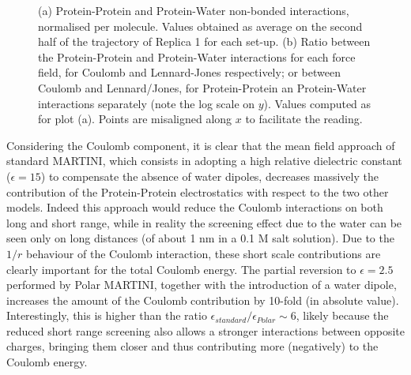 \begin{figure}[p!]
\centering
{} 
\caption[Non-bonded protein energy contribution to capsule structures]{(a) Protein-Protein and Protein-Water non-bonded interactions, normalised per molecule. Values obtained as average on the second half of the trajectory of Replica 1 for each set-up. (b) Ratio between the Protein-Protein and Protein-Water interactions for each force field, for Coulomb and Lennard-Jones respectively; or between Coulomb and Lennard/Jones, for Protein-Protein an Protein-Water interactions separately (note the log scale on $y$). Values computed as for plot (a). Points are misaligned along $x$ to facilitate the reading.}
\label{fig:eng_cg}
\end{figure}

Considering the Coulomb component, it is clear that the mean field approach of standard MARTINI, which consists in adopting a high relative dielectric constant ($\epsilon = 15$) to compensate the absence of water dipoles, decreases massively the contribution of the Protein-Protein electrostatics with respect to the two other models.
%
Indeed this approach would reduce the Coulomb interactions on both long and short range, while in reality the screening effect due to the water can be seen only on long distances (of about 1 nm in a 0.1 M salt solution). Due to the $1/r$ behaviour of the Coulomb interaction, these short scale contributions are clearly important for the total Coulomb energy.
%
The partial reversion to $\epsilon = 2.5$ performed by Polar MARTINI, together with the introduction of a water dipole, increases the amount of the Coulomb contribution by 10-fold (in absolute value).
%
Interestingly, this is higher than the ratio $\epsilon_{standard}/\epsilon_{Polar} \sim 6$, likely because the reduced short range screening also allows a stronger interactions between opposite charges, bringing them closer and thus contributing more (negatively) to the Coulomb energy.

